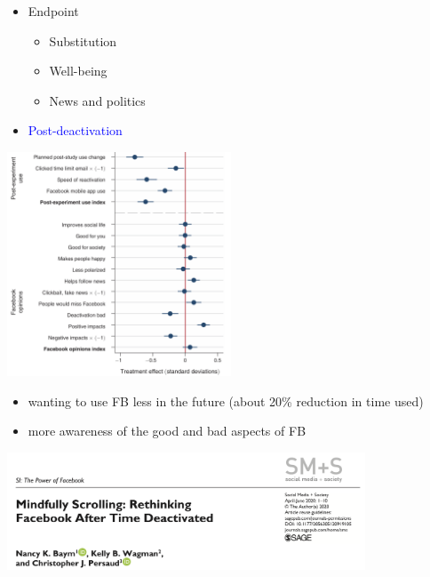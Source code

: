 \documentclass[aspectratio=169]{beamer}
\begin{document}
\begin{frame}

\begin{itemize}
\item Endpoint
\begin{itemize}
\item Substitution
\item Well-being
\item News and politics
\end{itemize}
\item \textcolor{blue}{Post-deactivation}
\end{itemize}

\end{frame}
\begin{frame}

\begin{center}
\includegraphics[width=0.5\textwidth]{figures/allcott_welfare_2020_fig6}
\end{center}

\begin{itemize}
\item wanting to use FB less in the future (about 20\% reduction in time used)
\item more awareness of the good and bad aspects of FB
\end{itemize}

\end{frame}
\begin{frame}

\begin{center}
\includegraphics[width=0.8\textwidth]{figures/baym_mindfully_2020_title}
\end{center}


\end{frame}
\end{document}
